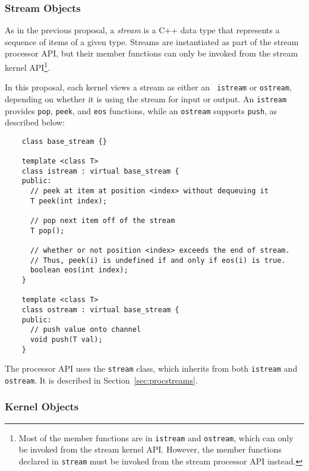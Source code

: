 \subsubsection{Stream Objects}
\label{sec:kerstreams}

As in the previous proposal, a {\it stream} is a C++ data type that
represents a sequence of items of a given type.  Streams are
instantiated as part of the stream processor API, but their member
functions can only be invoked from the stream kernel API\footnote{Most
of the member functions are in {\tt istream} and {\tt ostream}, which
can only be invoked from the stream kernel API.  However, the member
functions declared in {\tt stream} must be invoked from the stream
processor API instead.}.

In this proposal, each kernel views a stream as either an {\tt
istream} or {\tt ostream}, depending on whether it is using the stream
for input or output.  An {\tt istream} provides {\tt pop}, {\tt peek},
and {\tt eos} functions, while an {\tt ostream} supports {\tt push},
as described below: {\small
\begin{verbatim}
    class base_stream {}

    template <class T>
    class istream : virtual base_stream {
    public:
      // peek at item at position <index> without dequeuing it
      T peek(int index);

      // pop next item off of the stream
      T pop();

      // whether or not position <index> exceeds the end of stream.
      // Thus, peek(i) is undefined if and only if eos(i) is true.
      boolean eos(int index);
    }

    template <class T>
    class ostream : virtual base_stream {
    public:
      // push value onto channel
      void push(T val);
    }  
\end{verbatim}}

The processor API uses the {\tt stream} class, which inherits from
both {\tt istream} and {\tt ostream}. It is described in
Section~\ref{sec:procstreams}.

\subsubsection{Kernel Objects}
\label{sec:kernels}

